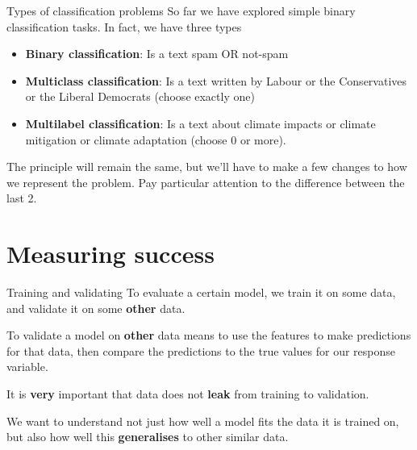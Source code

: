 \documentclass[
  10pt,
  ignorenonframetext,
  aspectratio=169]{beamer}
\providecommand{\tightlist}{%
  \setlength{\itemsep}{0pt}\setlength{\parskip}{0pt}}
\begin{document}
\begin{frame}{Types of classification problems}
\protect\hypertarget{types-of-classification-problems}{}
So far we have explored simple binary classification tasks. In fact, we
have three types

\begin{itemize}
\tightlist
\item
  \textbf{Binary classification}: Is a text spam OR not-spam
\item
  \textbf{Multiclass classification}: Is a text written by Labour or the
  Conservatives or the Liberal Democrats (choose exactly one)
\item
  \textbf{Multilabel classification}: Is a text about climate impacts or
  climate mitigation or climate adaptation (choose 0 or more).
\end{itemize}

The principle will remain the same, but we'll have to make a few changes
to how we represent the problem. Pay particular attention to the
difference between the last 2.
\end{frame}

\hypertarget{measuring-success}{%
\section{Measuring success}\label{measuring-success}}

\begin{frame}{Training and validating}
\protect\hypertarget{training-and-validating}{}
To evaluate a certain model, we train it on some data, and validate it
on some \textbf{other} data.

To validate a model on \textbf{other} data means to use the features to
make predictions for that data, then compare the predictions to the true
values for our response variable.

It is \textbf{very} important that data does not \textbf{leak} from
training to validation.

We want to understand not just how well a model fits the data it is
trained on, but also how well this \textbf{generalises} to other similar
data.
\end{frame}
\end{document}
